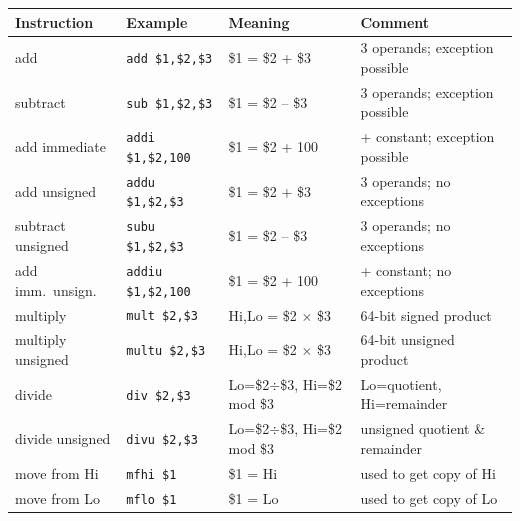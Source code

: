 \begin{center}
\begin{tabular}{@{}p{2.6cm}p{2.6cm}p{3.3cm}p{4.6cm}@{}}
\toprule
Instruction & Example & Meaning & Comment \\
\midrule
add            & \texttt{add \$1,\$2,\$3}   & \$1 = \$2 + \$3 & 3 operands; exception possible \\
subtract       & \texttt{sub \$1,\$2,\$3}   & \$1 = \$2 -- \$3 & 3 operands; exception possible \\
add immediate  & \texttt{addi \$1,\$2,100}  & \$1 = \$2 + 100 & + constant; exception possible \\
add unsigned   & \texttt{addu \$1,\$2,\$3}  & \$1 = \$2 + \$3 & 3 operands; no exceptions \\
subtract unsigned & \texttt{subu \$1,\$2,\$3} & \$1 = \$2 -- \$3 & 3 operands; no exceptions \\
add imm.\ unsign. & \texttt{addiu \$1,\$2,100} & \$1 = \$2 + 100 & + constant; no exceptions \\
multiply       & \texttt{mult \$2,\$3}      & Hi,Lo = \$2 $\times$ \$3 & 64-bit signed product \\
multiply unsigned & \texttt{multu \$2,\$3}  & Hi,Lo = \$2 $\times$ \$3 & 64-bit unsigned product \\
divide         & \texttt{div \$2,\$3}       & Lo=\$2$\div$\$3, Hi=\$2 mod \$3 & Lo=quotient, Hi=remainder \\
divide unsigned & \texttt{divu \$2,\$3}     & Lo=\$2$\div$\$3, Hi=\$2 mod \$3 & unsigned quotient \& remainder \\
move from Hi   & \texttt{mfhi \$1}          & \$1 = Hi & used to get copy of Hi \\
move from Lo   & \texttt{mflo \$1}          & \$1 = Lo & used to get copy of Lo \\
\bottomrule
\end{tabular}
\end{center}

